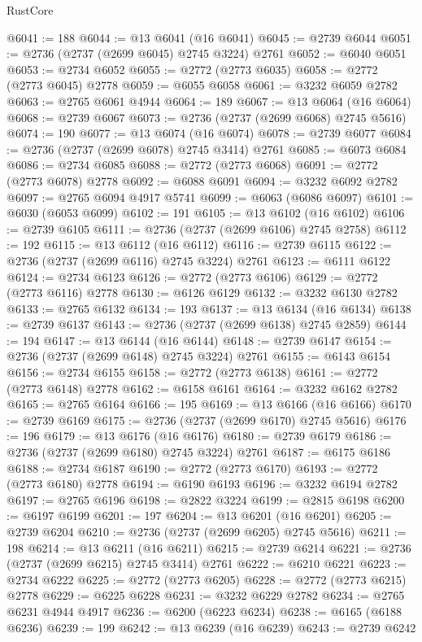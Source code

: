 \begin{lexlean}{RustCore}
\begin{coremodule}
@6041 := 188
@6044 := @13 @6041 (@16 @6041)
@6045 := @2739 @6044
@6051 := @2736 (@2737 (@2699 @6045) @2745 @3224) @2761
@6052 := @6040 @6051
@6053 := @2734 @6052
@6055 := @2772 (@2773 @6035)
@6058 := @2772 (@2773 @6045) @2778
@6059 := @6055 @6058
@6061 := @3232 @6059 @2782
@6063 := @2765 @6061 @4944
@6064 := 189
@6067 := @13 @6064 (@16 @6064)
@6068 := @2739 @6067
@6073 := @2736 (@2737 (@2699 @6068) @2745 @5616)
@6074 := 190
@6077 := @13 @6074 (@16 @6074)
@6078 := @2739 @6077
@6084 := @2736 (@2737 (@2699 @6078) @2745 @3414) @2761
@6085 := @6073 @6084
@6086 := @2734 @6085
@6088 := @2772 (@2773 @6068)
@6091 := @2772 (@2773 @6078) @2778
@6092 := @6088 @6091
@6094 := @3232 @6092 @2782
@6097 := @2765 @6094 @4917 @5741
@6099 := @6063 (@6086 @6097)
@6101 := @6030 (@6053 @6099)
@6102 := 191
@6105 := @13 @6102 (@16 @6102)
@6106 := @2739 @6105
@6111 := @2736 (@2737 (@2699 @6106) @2745 @2758)
@6112 := 192
@6115 := @13 @6112 (@16 @6112)
@6116 := @2739 @6115
@6122 := @2736 (@2737 (@2699 @6116) @2745 @3224) @2761
@6123 := @6111 @6122
@6124 := @2734 @6123
@6126 := @2772 (@2773 @6106)
@6129 := @2772 (@2773 @6116) @2778
@6130 := @6126 @6129
@6132 := @3232 @6130 @2782
@6133 := @2765 @6132
@6134 := 193
@6137 := @13 @6134 (@16 @6134)
@6138 := @2739 @6137
@6143 := @2736 (@2737 (@2699 @6138) @2745 @2859)
@6144 := 194
@6147 := @13 @6144 (@16 @6144)
@6148 := @2739 @6147
@6154 := @2736 (@2737 (@2699 @6148) @2745 @3224) @2761
@6155 := @6143 @6154
@6156 := @2734 @6155
@6158 := @2772 (@2773 @6138)
@6161 := @2772 (@2773 @6148) @2778
@6162 := @6158 @6161
@6164 := @3232 @6162 @2782
@6165 := @2765 @6164
@6166 := 195
@6169 := @13 @6166 (@16 @6166)
@6170 := @2739 @6169
@6175 := @2736 (@2737 (@2699 @6170) @2745 @5616)
@6176 := 196
@6179 := @13 @6176 (@16 @6176)
@6180 := @2739 @6179
@6186 := @2736 (@2737 (@2699 @6180) @2745 @3224) @2761
@6187 := @6175 @6186
@6188 := @2734 @6187
@6190 := @2772 (@2773 @6170)
@6193 := @2772 (@2773 @6180) @2778
@6194 := @6190 @6193
@6196 := @3232 @6194 @2782
@6197 := @2765 @6196
@6198 := @2822 @3224
@6199 := @2815 @6198
@6200 := @6197 @6199
@6201 := 197
@6204 := @13 @6201 (@16 @6201)
@6205 := @2739 @6204
@6210 := @2736 (@2737 (@2699 @6205) @2745 @5616)
@6211 := 198
@6214 := @13 @6211 (@16 @6211)
@6215 := @2739 @6214
@6221 := @2736 (@2737 (@2699 @6215) @2745 @3414) @2761
@6222 := @6210 @6221
@6223 := @2734 @6222
@6225 := @2772 (@2773 @6205)
@6228 := @2772 (@2773 @6215) @2778
@6229 := @6225 @6228
@6231 := @3232 @6229 @2782
@6234 := @2765 @6231 @4944 @4917
@6236 := @6200 (@6223 @6234)
@6238 := @6165 (@6188 @6236)
@6239 := 199
@6242 := @13 @6239 (@16 @6239)
@6243 := @2739 @6242

\end{coremodule}
\end{lexlean}
